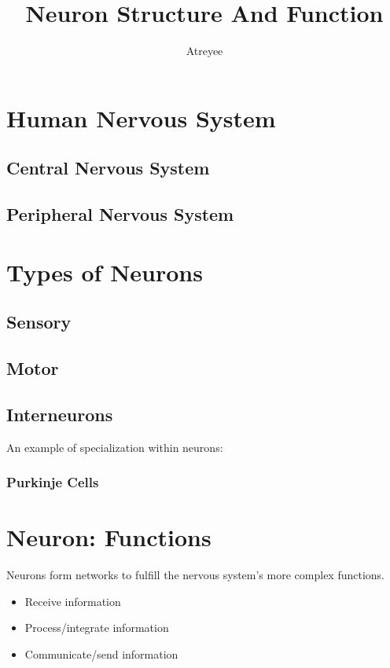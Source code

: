 \documentclass[letterpaper,12pt]{article}
\title{Neuron Structure And Function}
\author{Atreyee}
\begin{document}
\maketitle

\section{Human Nervous System}

\subsection{Central Nervous System}

\subsection{Peripheral Nervous System}

\section{Types of Neurons}

\subsection{Sensory}

\subsection{Motor}

\subsection{Interneurons}

An example of specialization within neurons:

\subsubsection{Purkinje Cells}

\section{Neuron: Functions}

Neurons form networks to fulfill the nervous system's more complex functions.

\begin{itemize}
\item
Receive information
\item
Process/integrate information
\item
Communicate/send information
\end{itemize}
\end{document}
